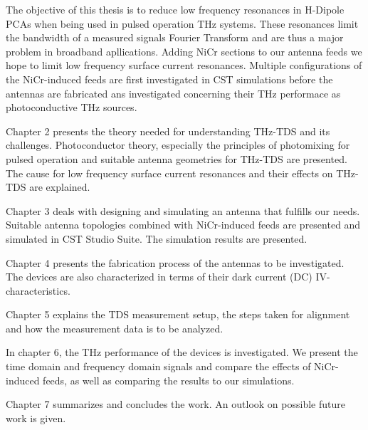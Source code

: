 The objective of this thesis is to reduce low frequency resonances in H-Dipole PCAs when being used in pulsed operation THz systems. These resonances limit the bandwidth of a measured signals Fourier Transform and are thus a major problem in broadband apllications. Adding NiCr sections to our antenna feeds we hope to limit low frequency surface current resonances. Multiple configurations of the NiCr-induced feeds are first investigated in CST simulations before the antennas are fabricated ans investigated concerning their THz performace as photoconductive THz sources.  

Chapter 2 presents the theory needed for understanding THz-TDS and its challenges. Photoconductor theory, especially the principles of photomixing for pulsed operation and suitable antenna geometries for THz-TDS are presented. The cause for low frequency surface current resonances and their effects on THz-TDS are explained. 

Chapter 3 deals with designing and simulating an antenna that fulfills our needs. Suitable antenna topologies combined with NiCr-induced feeds are presented and simulated in CST Studio Suite. The simulation results are presented. 

Chapter 4 presents the fabrication process of the antennas to be investigated. The devices are also characterized in terms of their dark current (DC) IV-characteristics. 

Chapter 5 explains the TDS measurement setup, the steps taken for alignment and how the measurement data is to be analyzed. 

In chapter 6, the THz performance of the devices is investigated. We present the time domain and frequency domain signals and compare the effects of NiCr-induced feeds, as well as comparing the results to our simulations. 

Chapter 7 summarizes and concludes the work. An outlook on possible future work is given.  
